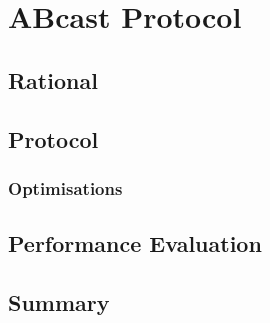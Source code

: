 \chapter{ABcast Protocol}

    \graphicspath{{Chapter4/Figs/Vector/}{Chapter4/Figs/}}


\section{Rational}

\section{Protocol}
	\subsection{Optimisations}
	
\section{Performance Evaluation}

\section{Summary}